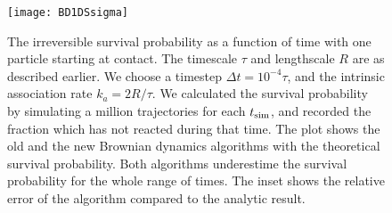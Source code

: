 \begin{figure}[hb]
\centering
\texttt{[image: BD1DSsigma]}
\caption{ The irreversible survival probability as a function of time with one particle starting at contact. The timescale $\tau$ and lengthscale $R$ are as described earlier. We choose a timestep $\Delta t = 10^{-4} \tau$, and the intrinsic association rate $k_a=2 R/\tau$. We calculated the survival probability by simulating a million trajectories for each $t_{\rm sim}$, and recorded the fraction which has not reacted during that time. The plot shows the old and the new Brownian dynamics algorithms with the theoretical survival probability. Both algorithms underestime the survival probability for the whole range of times. The inset shows the relative error of the algorithm compared to the analytic result.}
\end{figure}